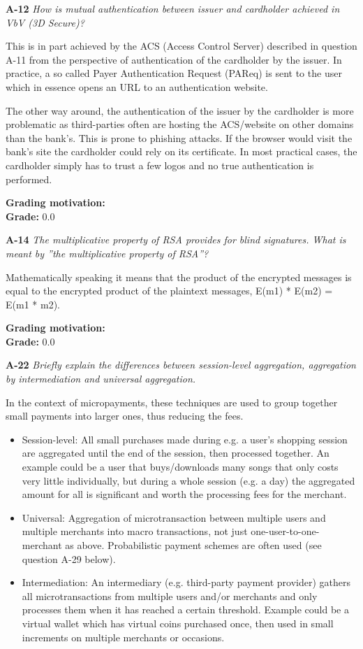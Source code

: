\documentclass[a4paper]{article}
\newcommand{\Q}[2]{
  \vspace{10pt} \textbf{#1} \textit{#2}
 }
\newcommand{\A}[1]{ #1 }
\newcommand{\Grade}[2]{ 
  \textbf{Grading motivation:} #2 \\ 
  \hspace*{\fill} \textbf{Grade:} #1 
}
\begin{document}
\Q{A-12} {How is mutual authentication between issuer and cardholder achieved in
VbV (3D Secure)?}

\A{
  This is in part achieved by the ACS (Access Control Server) described in question A-11
  from the perspective of authentication of the cardholder by the issuer. In practice, a so called
  Payer Authentication Request (PAReq) is sent to the user which in essence opens an URL to
  an authentication website.

  The other way around, the authentication of the issuer by the cardholder is more problematic as
  third-parties often are hosting the ACS/website on other domains than the bank’s. This is prone
  to phishing attacks. If the browser would visit the bank’s site the cardholder could rely on its
  certificate. In most practical cases, the cardholder simply has to trust a few logos and no true
  authentication is performed.
}

\Grade{0.0}{}

\Q{A-14} {The multiplicative property of RSA provides for blind signatures. What is meant by ”the multiplicative property of RSA”?}

\A{
  Mathematically speaking it means that the product of the encrypted messages is equal
  to the encrypted product of the plaintext messages, E(m1) * E(m2) = E(m1 * m2).
}

\Grade{0.0}{}

\Q{A-22} {Briefly explain the differences between session-level aggregation,
aggregation by intermediation and universal aggregation.}

\A{
  In the context of micropayments, these techniques are used to group together small
  payments into larger ones, thus reducing the fees.
  \begin{itemize}
    \item{Session-level: All small purchases made during e.g. a user’s shopping session are
    aggregated until the end of the session, then processed together. An example could be
    a user that buys/downloads many songs that only costs very little individually, but during
    a whole session (e.g. a day) the aggregated amount for all is significant and worth the
    processing fees for the merchant.}
   \item{Universal: Aggregation of microtransaction between multiple users and multiple
    merchants into macro transactions, not just one-user-to-one-merchant as above.
    Probabilistic payment schemes are often used (see question A-29 below).}
   \item{Intermediation: An intermediary (e.g. third-party payment provider) gathers all
    microtransactions from multiple users and/or merchants and only processes them when
    it has reached a certain threshold. Example could be a virtual wallet which has virtual
    coins purchased once, then used in small increments on multiple merchants or
    occasions.}
  \end{itemize}
}
\end{document}
